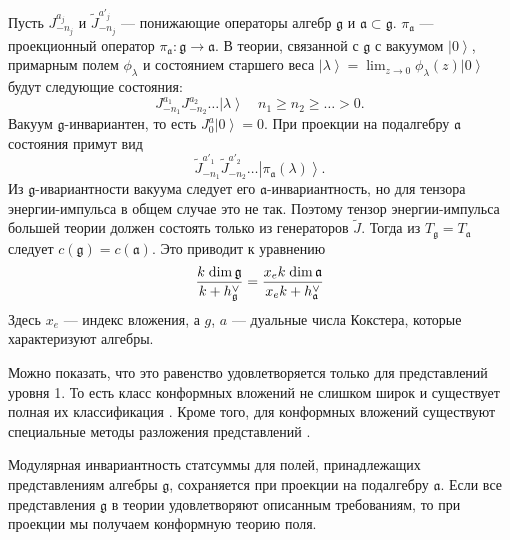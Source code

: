 Пусть $J^{a_j}_{-n_j}$ и $\tilde{J}^{a'_j}_{-n_j}$ --- понижающие операторы алгебр  $\mathfrak{g}$ и
$\mathfrak{a}\subset\mathfrak{g}$.  $\pi_{\mathfrak{a}}$ --- проекционный оператор
$\pi_{\mathfrak{a}}:\mathfrak{g}\longrightarrow \mathfrak{a}$. В теории, связанной с  $\mathfrak{g}$
с вакуумом $\left| 0\right>$, примарным полем $\phi_{\lambda}$ и состоянием старшего веса  $\left|\lambda\right>=\lim_{z\to 0} \phi_{\lambda}(z) \left|0\right>$ будут следующие состояния:
\begin{equation}
  \label{eq:109}
  J^{a_1}_{-n_1}J^{a_2}_{-n_2}\dots\left|\lambda\right>\quad n_1\geq n_2\geq \dots>0.
\end{equation}
Вакуум $\mathfrak{g}$-инвариантен, то есть $J_0^a\left|0\right>=0$. При проекции на подалгебру
$\mathfrak{a}$ состояния примут вид
\begin{equation}
  \label{eq:110}
  \tilde{J}^{a'_1}_{-n_1}\tilde{J}^{a'_2}_{-n_2}\dots\left|\pi_{\mathfrak{a}}(\lambda)\right>.
\end{equation}
Из $\mathfrak{g}$-ивариантности вакуума следует его $\mathfrak{a}$-инвариантность, но для тензора
энергии-импульса в общем случае это не так. Поэтому тензор энергии-импульса большей теории должен
состоять только из генераторов $\tilde{J}$. Тогда из $T_{\mathfrak{g}}=T_{\mathfrak{a}}$ следует $c(\mathfrak{g})=c(\mathfrak{a})$. Это приводит к уравнению
\begin{equation}
  \label{eq:111}
  \frac{k\;\mathrm{dim}\,\mathfrak{g}}{k+h^{\vee}_{\mathfrak{g}}}=\frac{x_e k\; \mathrm{dim}\,\mathfrak{a}}{x_ek+h^{\vee}_{\mathfrak{a}}}
\end{equation}
Здесь $x_e$ --- индекс вложения, а  $g$, $a$ --- дуальные числа Кокстера, которые характеризуют алгебры.

Можно показать, что это равенство удовлетворяется только для представлений уровня 1. То есть класс
конформных вложений не слишком широк и существует полная их классификация \cite{difrancesco1997cft}. Кроме того, для
конформных вложений существуют специальные методы разложения представлений \cite{altschuler1990branching}.

Модулярная инвариантность статсуммы для полей, принадлежащих представлениям алгебры  $\mathfrak{g}$,
сохраняется при проекции на подалгебру $\mathfrak{a}$. Если все представления $\mathfrak{g}$ в теории
удовлетворяют описанным требованиям, то при проекции мы получаем конформную теорию поля.

